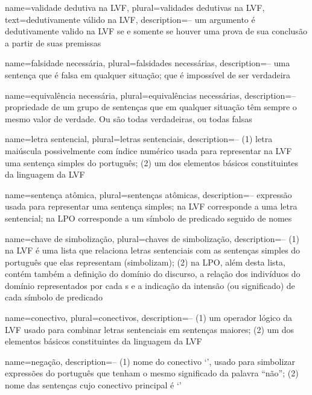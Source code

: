 {
 name={validade dedutiva na LVF},
 plural={validades dedutivas na LVF},
 text={dedutivamente válido na LVF},
 description={-- um argumento é dedutivamente valido na LVF se e
somente se houver uma prova de sua conclusão a partir de suas premissas}
}

{
 name={falsidade necessária},
 plural={falsidades necessárias},
 description={-- uma sentença que é falsa em qualquer situação; que é impossível de ser verdadeira}
}

{
 name={equivalência necessária},
 plural={equivalências necessárias},
 description={-- propriedade de um grupo de sentenças que em qualquer situação têm sempre o mesmo valor de verdade. Ou são todas verdadeiras, ou todas falsas}
}

{
 name=letra sentencial,
 plural=letras sentenciais,
 description={-- (1) letra maiúscula possivelmente com índice numérico usada para representar na LVF uma sentença simples do português; (2) um dos elementos básicos constituintes da linguagem da LVF}
}

{
 name=sentença atômica,
 plural=sentenças atômicas,
 description={-- expressão usada para representar uma sentença simples; na LVF corresponde a uma letra sentencial; na LPO corresponde a um símbolo de predicado seguido de nomes}
}

{
 name=chave de simbolização,
 plural=chaves de simbolização,
 description={-- (1) na LVF é uma lista que relaciona letras sentenciais com as sentenças simples do português que elas representam (simbolizam); (2) na LPO, além desta lista, contém também a definição do domínio do discurso, a relação dos indivíduos do domínio representados por cada s e a indicação da intensão (ou significado) de cada símbolo de predicado}
}

{
 name=conectivo,
 plural=conectivos,
description={-- (1) um operador lógico da LVF usado para combinar letras sentenciais em sentenças maiores; (2) um dos elementos básicos constituintes da linguagem da LVF}
}

{
 name=negação,
 description={-- (1) nome do conectivo `\enot', usado para simbolizar expressões do português que tenham o mesmo significado da palavra ``não''; (2) nome das sentenças cujo conectivo principal é `\enot'}
}

